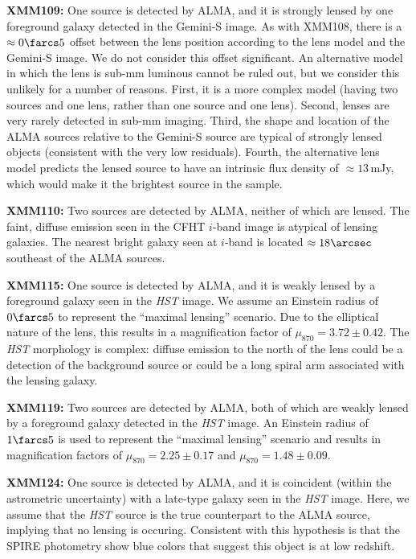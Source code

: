 \documentclass[iop]{emulateapj}
\begin{document}
{\bf XMM109:} One source is detected by ALMA, and it is strongly lensed by one
foreground galaxy detected in the Gemini-S image.  As with XMM108, there is a
$\approx 0\farcs5$ offset between the lens position according to the lens model
and the Gemini-S image.  We do not consider this offset significant.  An
alternative model in which the lens is sub-mm luminous cannot be ruled out, but
we consider this unlikely for a number of reasons.  First, it is a more complex
model (having two sources and one lens, rather than one source and one lens).
Second, lenses are very rarely detected in sub-mm imaging.  Third, the shape
and location of the ALMA sources relative to the Gemini-S source are typical of
strongly lensed objects (consistent with the very low residuals).  Fourth, the
alternative lens model predicts the lensed source to have an intrinsic flux
density of $\approx 13 \,$mJy, which would make it the brightest source in the
sample.

{\bf XMM110:} Two sources are detected by ALMA, neither of which are lensed.
The faint, diffuse emission seen in the CFHT $i$-band image is atypical of
lensing galaxies.  The nearest bright galaxy seen at $i$-band is located
$\approx 18\arcsec$ southeast of the ALMA sources.

{\bf XMM115:} One source is detected by ALMA, and it is weakly lensed by a
foreground galaxy seen in the {\it HST} image.  We assume an Einstein radius of
$0\farcs5$ to represent the ``maximal lensing'' scenario.  Due to the
elliptical nature of the lens, this results in a magnification factor of
$\mu_{870} = 3.72 \pm 0.42$.  The {\it HST} morphology is complex: diffuse
emission to the north of the lens could be a detection of the background source
or could be a long spiral arm associated with the lensing galaxy.

{\bf XMM119:} Two sources are detected by ALMA, both of which are weakly
lensed by a foreground galaxy detected in the {\it HST} image.  An Einstein
radius of $1\farcs5$ is used to represent the ``maximal lensing'' scenario and
results in magnification factors of $\mu_{870} = 2.25 \pm 0.17$ and $\mu_{870}
= 1.48 \pm 0.09$.

{\bf XMM124:} One source is detected by ALMA, and it is coincident (within the
astrometric uncertainty) with a late-type galaxy seen in the {\it HST} image.
Here, we assume that the {\it HST} source is the true counterpart to the ALMA
source, implying that no lensing is occuring.  Consistent with this hypothesis
is that the SPIRE photometry show blue colors that suggest this object is at low
redshift.
\end{document}
